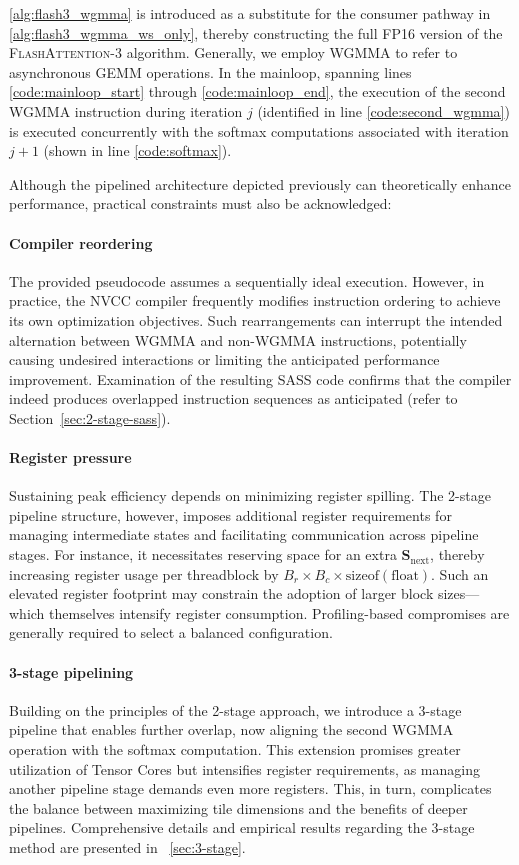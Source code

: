 \cref{alg:flash3_wgmma} is introduced as a substitute for the consumer pathway in \cref{alg:flash3_wgmma_ws_only}, thereby constructing the full FP16 version of the \textsc{FlashAttention-3} algorithm. Generally, we employ WGMMA to refer to asynchronous GEMM operations. In the mainloop, spanning lines \ref{code:mainloop_start} through \ref{code:mainloop_end}, the execution of the second WGMMA instruction during iteration $j$ (identified in line \ref{code:second_wgmma}) is executed concurrently with the softmax computations associated with iteration $j+1$ (shown in line \ref{code:softmax}).

Although the pipelined architecture depicted previously can theoretically enhance performance, practical constraints must also be acknowledged:

\paragraph{Compiler reordering} The provided pseudocode assumes a sequentially ideal execution. However, in practice, the NVCC compiler frequently modifies instruction ordering to achieve its own optimization objectives. Such rearrangements can interrupt the intended alternation between WGMMA and non-WGMMA instructions, potentially causing undesired interactions or limiting the anticipated performance improvement. Examination of the resulting SASS code confirms that the compiler indeed produces overlapped instruction sequences as anticipated (refer to Section~\ref{sec:2-stage-sass}).

\paragraph{Register pressure} Sustaining peak efficiency depends on minimizing register spilling. The 2-stage pipeline structure, however, imposes additional register requirements for managing intermediate states and facilitating communication across pipeline stages. For instance, it necessitates reserving space for an extra $\mathbf{S}_{\mathrm{next}}$, thereby increasing register usage per threadblock by $B_r \times B_c \times \text{sizeof}(\text{float})$. Such an elevated register footprint may constrain the adoption of larger block sizes—which themselves intensify register consumption. Profiling-based compromises are generally required to select a balanced configuration.

\paragraph{3-stage pipelining} Building on the principles of the 2-stage approach, we introduce a 3-stage pipeline that enables further overlap, now aligning the second WGMMA operation with the softmax computation. This extension promises greater utilization of Tensor Cores but intensifies register requirements, as managing another pipeline stage demands even more registers. This, in turn, complicates the balance between maximizing tile dimensions and the benefits of deeper pipelines. Comprehensive details and empirical results regarding the 3-stage method are presented in ~\cref{sec:3-stage}.

